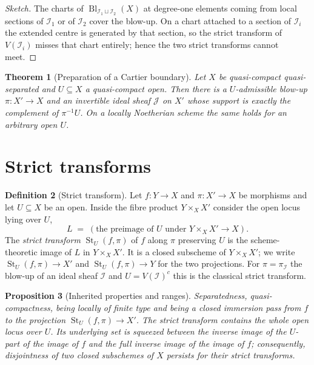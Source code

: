 \documentclass[11pt,a4paper]{article}
\theoremstyle{plain}
\newtheorem{theorem}{Theorem}[section]
\newtheorem{proposition}[theorem]{Proposition}
\theoremstyle{definition}
\newtheorem{definition}[theorem]{Definition}
\theoremstyle{remark}
\newcommand{\Bl}{\operatorname{Bl}}
\newcommand{\sI}{\mathcal{I}}
\newcommand{\sJ}{\mathcal{J}}
\newcommand{\qcqs}{quasi-compact quasi-separated}
\newcommand{\stt}[3]{\operatorname{St}_{#3}(#1,#2)}
\begin{document}
\begin{proof}[Sketch]
The charts of $\Bl_{\sI_1\sqcup\sI_2}(X)$ at degree-one elements coming from
local sections of $\sI_1$ or of $\sI_2$ cover the blow-up. On a chart attached
to a section of $\sI_i$ the extended centre is generated by that section, so
the strict transform of $V(\sI_i)$ misses that chart entirely; hence the two
strict transforms cannot meet.
\end{proof}

\begin{theorem}[Preparation of a Cartier boundary]
\label{thm:080Y}
Let $X$ be \qcqs{} and $U\subseteq X$ a quasi-compact open. Then there is a
$U$-admissible blow-up $\pi\colon X'\to X$ and an invertible ideal sheaf $\sJ$
on $X'$ whose support is exactly the complement of $\pi^{-1}U$. On a locally
Noetherian scheme the same holds for an arbitrary open $U$.
\end{theorem}

\section{Strict transforms}
\label{sec:strict-transform}

\begin{definition}[Strict transform]
\label{def:strict-transform}
Let $f\colon Y\to X$ and $\pi\colon X'\to X$ be morphisms and let $U\subseteq
X$ be an open. Inside the fibre product $Y\times_X X'$ consider the open locus
lying over $U$,
\[
  L \;=\; (\text{the preimage of }U\text{ under } Y\times_X X'\to X).
\]
The \emph{strict transform} $\stt{f}{\pi}{U}$ of $f$ along $\pi$ preserving
$U$ is the scheme-theoretic image of $L$ in $Y\times_X X'$. It is a closed
subscheme of $Y\times_X X'$; we write $\stt{f}{\pi}{U}\to X'$ and
$\stt{f}{\pi}{U}\to Y$ for the two projections. For $\pi=\pi_\sI$ the blow-up
of an ideal sheaf $\sI$ and $U=V(\sI)^{c}$ this is the classical strict
transform.
\end{definition}

\begin{proposition}[Inherited properties and ranges]
\label{prop:strict-transform-basic}
Separatedness, quasi-compactness, being locally of finite type and being a
closed immersion pass from $f$ to the projection $\stt{f}{\pi}{U}\to X'$. The
strict transform contains the whole open locus over $U$. Its underlying set is
squeezed between the inverse image of the $U$-part of the image of $f$ and the
full inverse image of the image of $f$; consequently, disjointness of two
closed subschemes of $X$ persists for their strict transforms.
\end{proposition}
\end{document}
